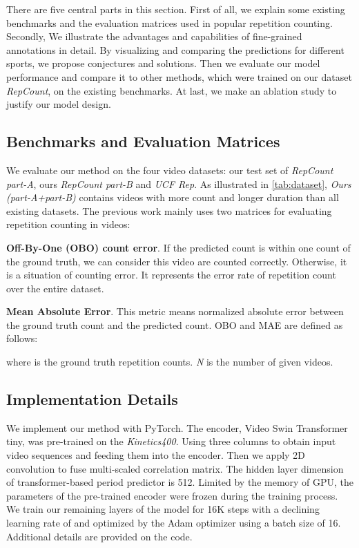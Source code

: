 \documentclass[10pt,twocolumn,letterpaper]{article}
\begin{document}
 There are five central parts in this section. First of all, we explain some existing benchmarks and the evaluation matrices used in popular repetition counting. Secondly, We illustrate the advantages and capabilities of fine-grained annotations in detail. By visualizing and comparing the predictions for different sports, we propose conjectures and solutions. Then we evaluate our model performance and compare it to other methods, which were trained on our dataset \emph{RepCount}, on the existing benchmarks. At last, we make an ablation study to justify our model design.

\subsection{Benchmarks and Evaluation Matrices}
We evaluate our method on the four video datasets: our test set of \emph{RepCount part-A}, ours \emph{RepCount part-B} and \emph{UCF Rep}\cite{Zhang_2020_CVPR}. As illustrated in \cref{tab:dataset}, \emph{ Ours (part-A+part-B)} contains videos with more count and longer duration than all  existing datasets. The previous work\cite{RepNet, Zhang_2020_CVPR} mainly uses two  matrices for evaluating repetition counting in videos:

\noindent \textbf{Off-By-One (OBO) count error}. If the predicted count is within one count of the ground truth, we can consider this video are counted correctly. Otherwise, it is a situation of counting error. It represents the error rate of repetition count over the entire dataset.

\noindent \textbf{Mean Absolute Error}. This metric means normalized absolute error between the ground truth count and the predicted count.
OBO and MAE are defined as follows:


 
where  is the ground truth repetition counts. \emph{N} is the number of given videos.

\subsection{Implementation Details}
We implement our method with PyTorch. The encoder, Video Swin Transformer tiny\cite{video-swin-transformer}, was pre-trained on the \emph{Kinetics400}. Using three columns to obtain input video sequences and feeding them into the encoder. Then we apply 2D convolution to fuse multi-scaled correlation matrix. The hidden layer dimension of transformer-based period predictor is 512. Limited by the memory of GPU, the parameters of the pre-trained encoder were frozen during the training process. We train our remaining layers of the model for 16K steps with a declining learning rate of  and optimized by the Adam optimizer using a batch size of 16. Additional details are provided on the code.
\end{document}
